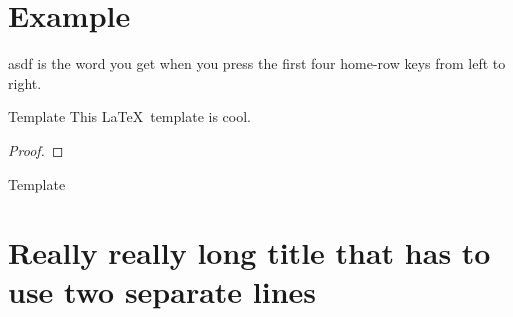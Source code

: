 \documentclass[12pt]{report}
\begin{document}
    \chapter{Example}

    \lipsum[1]
    \begin{dfnbox}{asdf}
         is the word you get when you press the first four home-row keys from left to right.
    \end{dfnbox}

    \begin{thmbox}{Template}
        This \LaTeX\ template is cool.
        \tcblower
        \begin{proof}
            \lipsum[1]
        \end{proof}
    \end{thmbox}

    \begin{exbox}{Template}
        \lipsum[1]
    \end{exbox}

    \chapter{Really really long title that has to use two separate lines}
\end{document}
